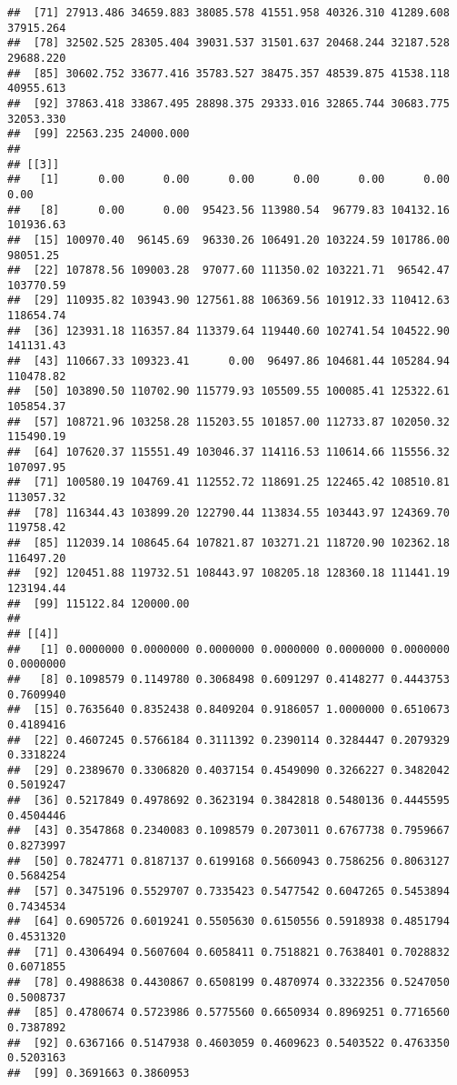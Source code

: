 \documentclass[
]{article}
\begin{document}
\begin{verbatim}
##  [71] 27913.486 34659.883 38085.578 41551.958 40326.310 41289.608 37915.264
##  [78] 32502.525 28305.404 39031.537 31501.637 20468.244 32187.528 29688.220
##  [85] 30602.752 33677.416 35783.527 38475.357 48539.875 41538.118 40955.613
##  [92] 37863.418 33867.495 28898.375 29333.016 32865.744 30683.775 32053.330
##  [99] 22563.235 24000.000
## 
## [[3]]
##   [1]      0.00      0.00      0.00      0.00      0.00      0.00      0.00
##   [8]      0.00      0.00  95423.56 113980.54  96779.83 104132.16 101936.63
##  [15] 100970.40  96145.69  96330.26 106491.20 103224.59 101786.00  98051.25
##  [22] 107878.56 109003.28  97077.60 111350.02 103221.71  96542.47 103770.59
##  [29] 110935.82 103943.90 127561.88 106369.56 101912.33 110412.63 118654.74
##  [36] 123931.18 116357.84 113379.64 119440.60 102741.54 104522.90 141131.43
##  [43] 110667.33 109323.41      0.00  96497.86 104681.44 105284.94 110478.82
##  [50] 103890.50 110702.90 115779.93 105509.55 100085.41 125322.61 105854.37
##  [57] 108721.96 103258.28 115203.55 101857.00 112733.87 102050.32 115490.19
##  [64] 107620.37 115551.49 103046.37 114116.53 110614.66 115556.32 107097.95
##  [71] 100580.19 104769.41 112552.72 118691.25 122465.42 108510.81 113057.32
##  [78] 116344.43 103899.20 122790.44 113834.55 103443.97 124369.70 119758.42
##  [85] 112039.14 108645.64 107821.87 103271.21 118720.90 102362.18 116497.20
##  [92] 120451.88 119732.51 108443.97 108205.18 128360.18 111441.19 123194.44
##  [99] 115122.84 120000.00
## 
## [[4]]
##   [1] 0.0000000 0.0000000 0.0000000 0.0000000 0.0000000 0.0000000 0.0000000
##   [8] 0.1098579 0.1149780 0.3068498 0.6091297 0.4148277 0.4443753 0.7609940
##  [15] 0.7635640 0.8352438 0.8409204 0.9186057 1.0000000 0.6510673 0.4189416
##  [22] 0.4607245 0.5766184 0.3111392 0.2390114 0.3284447 0.2079329 0.3318224
##  [29] 0.2389670 0.3306820 0.4037154 0.4549090 0.3266227 0.3482042 0.5019247
##  [36] 0.5217849 0.4978692 0.3623194 0.3842818 0.5480136 0.4445595 0.4504446
##  [43] 0.3547868 0.2340083 0.1098579 0.2073011 0.6767738 0.7959667 0.8273997
##  [50] 0.7824771 0.8187137 0.6199168 0.5660943 0.7586256 0.8063127 0.5684254
##  [57] 0.3475196 0.5529707 0.7335423 0.5477542 0.6047265 0.5453894 0.7434534
##  [64] 0.6905726 0.6019241 0.5505630 0.6150556 0.5918938 0.4851794 0.4531320
##  [71] 0.4306494 0.5607604 0.6058411 0.7518821 0.7638401 0.7028832 0.6071855
##  [78] 0.4988638 0.4430867 0.6508199 0.4870974 0.3322356 0.5247050 0.5008737
##  [85] 0.4780674 0.5723986 0.5775560 0.6650934 0.8969251 0.7716560 0.7387892
##  [92] 0.6367166 0.5147938 0.4603059 0.4609623 0.5403522 0.4763350 0.5203163
##  [99] 0.3691663 0.3860953
\end{verbatim}
\end{document}
